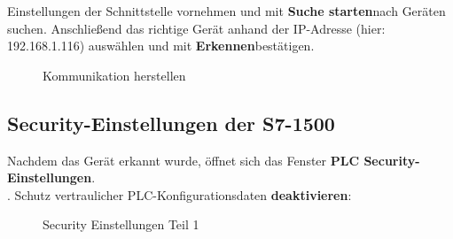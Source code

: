 Einstellungen der Schnittstelle vornehmen und mit \glqq\textbf{Suche starten}\grqq\:nach Geräten suchen. Anschließend das richtige Gerät anhand der IP-Adresse (hier: 192.168.1.116) auswählen und mit \glqq\textbf{Erkennen}\grqq\:bestätigen.
\begin{figure}[H]
   \centering
   \caption[Kommunikation herstellen]{Kommunikation herstellen}
   \label{fig:Bild3.4}
\end{figure}

\subsection{Security-Einstellungen der S7-1500}
Nachdem das Gerät erkannt wurde, öffnet sich das Fenster \textbf{PLC Security-Einstellungen}.\\
. Schutz vertraulicher PLC-Konfigurationsdaten \textbf{deaktivieren}:
\begin{figure}[H]
   \centering
   \caption[Security Einstellungen Teil 1]{Security Einstellungen Teil 1}
   \label{fig:Bild3.5}
\end{figure}

